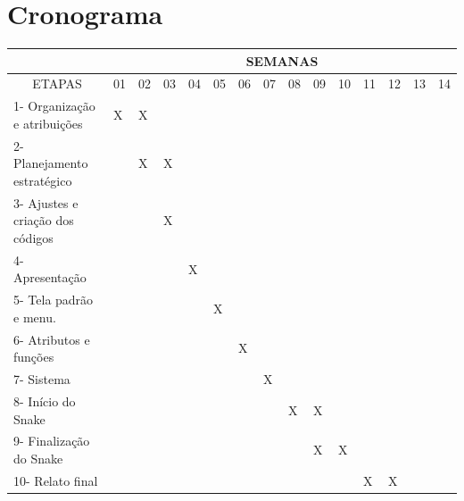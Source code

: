 \documentclass[a4paper,10pt]{article} %
\begin{document}
\section{Cronograma}


\begin{table}[H]
\begin{tabular}{|l|l|l|l|l|l|l|l|l|l|l|l|l|l|l|}
\hline
\multicolumn{1}{|c|}{} & \multicolumn{14}{c|}{SEMANAS} \\ \hline
\multicolumn{1}{|c|}{ETAPAS} & \multicolumn{1}{c|}{01} & 02 & 03 & 04 & 05 & 06 & 07 & 08 & 09 & 10 & 11 & 12 & 13 & 14 \\ \hline
1- Organização e atribuições & X & X &  &  &  &  &  &  &  &  &  &  &  &  \\ \hline
2- Planejamento estratégico &  & X & X &  &  &  &  &  &  &  &  &  &  &  \\ \hline
3- Ajustes e criação dos códigos &  &  & X &  &  &  &  &  &  &  &  &  &  &  \\ \hline
4- Apresentação &  &  &  & X &  &  &  &  &  &  &  &  &  &  \\ \hline
5- Tela padrão e menu. &  &  &  &  & X &  &  &  &  &  &  &  &  &  \\ \hline
6- Atributos e funções &  &  &  &  &  & X &  &  &  &  &  &  &  &  \\ \hline
7- Sistema &  &  &  &  &  &  & X &  &  &  &  &  &  &  \\ \hline
8- Início do Snake &  &  &  &  &  &  &  & X & X &  &  &  &  &  \\ \hline
9- Finalização do Snake &  &  &  &  &  &  &  &  & X & X &  &  &  &  \\ \hline
10- Relato final &  &  &  &  &  &  &  &  &  &  & X & X &  &  \\ \hline
\end{tabular}
\end{table}
\end{document}
